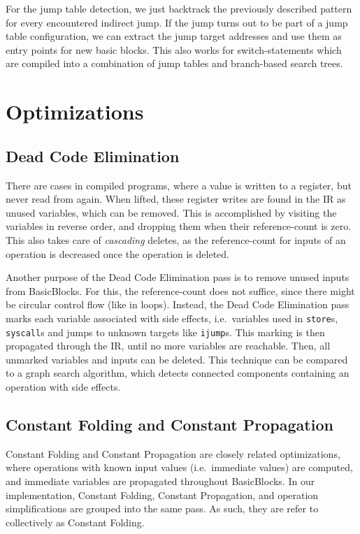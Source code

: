\documentclass[course=eragp]{aspdoc}
\begin{document}
\par

For the jump table detection, we just backtrack the previously described pattern for every
encountered indirect jump. If the jump turns out to be part of a jump table configuration, we can
extract the jump target addresses and use them as entry points for new basic blocks. This also works
for switch-statements which are compiled into a combination of jump tables and branch-based search
trees.

\section{Optimizations}\label{sec:optimizations}
\subsection{Dead Code Elimination}\label{dead_code_elimination}

There are cases in compiled programs, where a value is written to a register, but never read from again.
When lifted, these register writes are found in the IR as unused variables, which can be removed.
This is accomplished by visiting the variables in reverse order, and dropping them when their reference-count is zero.
This also takes care of \textit{cascading} deletes, as the reference-count for inputs of an operation is decreased once the
operation is deleted.

Another purpose of the Dead Code Elimination pass is to remove unused inputs from BasicBlocks. For this, the
reference-count does not suffice, since there might be circular control flow (like in loops). Instead, the Dead Code
Elimination pass marks each variable associated with side effects, i.e.\ variables used in \texttt{store}s,
\texttt{syscall}s and jumps to unknown targets like \texttt{ijump}s. This marking is then propagated through the IR,
until no more variables are reachable. Then, all unmarked variables and inputs can be deleted. This
technique can be compared to a graph search algorithm, which detects connected components containing an operation with
side effects.

\subsection{Constant Folding and Constant Propagation}\label{constant_folding}

Constant Folding and Constant Propagation are closely related optimizations, where operations with known input values
(i.e.\ immediate values) are computed, and immediate variables are propagated throughout BasicBlocks.
In our implementation, Constant Folding, Constant Propagation, and operation simplifications are grouped into the same
pass.  As such, they are refer to collectively as Constant Folding.
\end{document}
